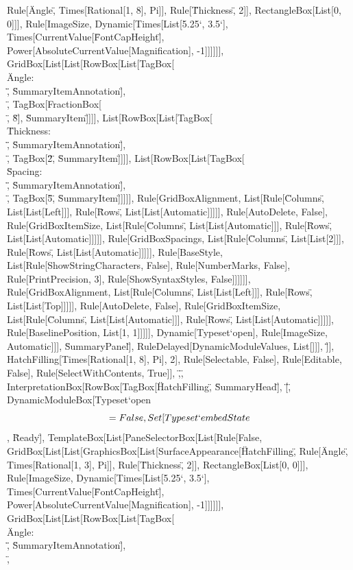 \documentclass{article}
\begin{document}
{{{{Rule[\"Angle\", Times[Rational[1, 8], Pi]], Rule[\"Thickness\", 2]], RectangleBox[List[0, 0]]], Rule[ImageSize, Dynamic[Times[List[5.25`, 3.5`],
Times[CurrentValue[\"FontCapHeight\"], Power[AbsoluteCurrentValue[Magnification], -1]]]]]], GridBox[List[List[RowBox[List[TagBox[\"\\\"Angle: \\\"\",
\"SummaryItemAnnotation\"], \"\\[InvisibleSpace]\", TagBox[FractionBox[\"\\[Pi]\", \"8\"], \"SummaryItem\"]]]], List[RowBox[List[TagBox[\"\\\"Thickness:
\\\"\", \"SummaryItemAnnotation\"], \"\\[InvisibleSpace]\", TagBox[\"2\", \"SummaryItem\"]]]], List[RowBox[List[TagBox[\"\\\"Spacing: \\\"\", \"SummaryItemAnnotation\"],
\"\\[InvisibleSpace]\", TagBox[\"5\", \"SummaryItem\"]]]]], Rule[GridBoxAlignment, List[Rule[\"Columns\", List[List[Left]]], Rule[\"Rows\", List[List[Automatic]]]]],
Rule[AutoDelete, False], Rule[GridBoxItemSize, List[Rule[\"Columns\", List[List[Automatic]]], Rule[\"Rows\", List[List[Automatic]]]]], Rule[GridBoxSpacings,
List[Rule[\"Columns\", List[List[2]]], Rule[\"Rows\", List[List[Automatic]]]]], Rule[BaseStyle, List[Rule[ShowStringCharacters, False], Rule[NumberMarks,
False], Rule[PrintPrecision, 3], Rule[ShowSyntaxStyles, False]]]]]], Rule[GridBoxAlignment, List[Rule[\"Columns\", List[List[Left]]], Rule[\"Rows\",
List[List[Top]]]]], Rule[AutoDelete, False], Rule[GridBoxItemSize, List[Rule[\"Columns\", List[List[Automatic]]], Rule[\"Rows\", List[List[Automatic]]]]],
Rule[BaselinePosition, List[1, 1]]]]], Dynamic[Typeset`open$$], Rule[ImageSize, Automatic]]], \"SummaryPanel\"], RuleDelayed[DynamicModuleValues,
List[]]], \"]\"}], HatchFilling[Times[Rational[1, 8], Pi], 2], Rule[Selectable, False], Rule[Editable, False], Rule[SelectWithContents, True]], \",\",
InterpretationBox[RowBox[{TagBox[\"HatchFilling\", \"SummaryHead\"], \"[\", DynamicModuleBox[{Typeset`open$$ = False, Set[Typeset`embedState$$, \"Ready\"]},
TemplateBox[List[PaneSelectorBox[List[Rule[False, GridBox[List[List[GraphicsBox[List[SurfaceAppearance[\"HatchFilling\", Rule[\"Angle\", Times[Rational[1,
3], Pi]], Rule[\"Thickness\", 2]], RectangleBox[List[0, 0]]], Rule[ImageSize, Dynamic[Times[List[5.25`, 3.5`], Times[CurrentValue[\"FontCapHeight\"],
Power[AbsoluteCurrentValue[Magnification], -1]]]]]], GridBox[List[List[RowBox[List[TagBox[\"\\\"Angle: \\\"\", \"SummaryItemAnnotation\"], \"\\[InvisibleSpace]\",
}}}}
\end{document}
